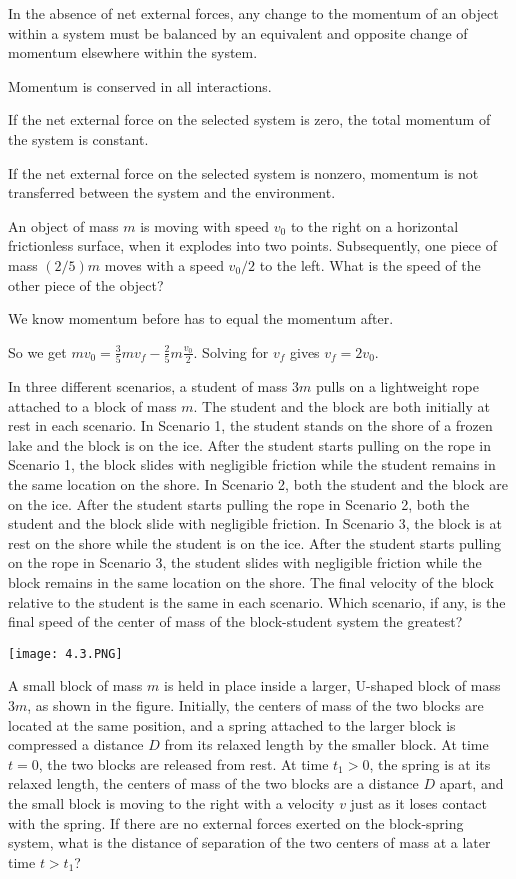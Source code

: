 \documentclass[../mech.tex]{subfiles}
\begin{document}
In the absence of net external forces, any change to the momentum of an object within a system must be balanced by an equivalent and opposite change of momentum elsewhere within the system.

Momentum is conserved in all interactions.

If the net external force on the selected system is zero, the total momentum of the system is constant.

If the net external force on the selected system is nonzero, momentum is not transferred between the system and the environment.

\begin{example}
    An object of mass $m$ is moving with speed $v_0$ to the right on a horizontal frictionless surface, when it explodes into two points. Subsequently, one piece of mass $(2/5)m$ moves with a speed $v_0/2$ to the left. What is the speed of the other piece of the object?

    We know momentum before has to equal the momentum after.

    So we get $mv_0=\frac{3}{5}mv_f-\frac{2}{5}m\frac{v_0}{2}$. Solving for $v_f$ gives $v_f=2v_0$.
\end{example}

\ex In three different scenarios, a student of mass $3m$ pulls on a lightweight rope attached to a block of mass $m$. The student and the block are both initially at rest in each scenario.
In Scenario 1, the student stands on the shore of a frozen lake and the block is on the ice. After the student starts pulling on the rope in Scenario 1, the block slides with negligible friction while the student remains in the same location on the shore.
In Scenario 2, both the student and the block are on the ice. After the student starts pulling the rope in Scenario 2, both the student and the block slide with negligible friction. In Scenario 3, the block is at rest on the shore while the student is on the ice.
After the student starts pulling on the rope in Scenario 3, the student slides with negligible friction while the block remains in the same location on the shore. The final velocity of the block relative to the student is the same in each scenario.
Which scenario, if any, is the final speed of the center of mass of the block-student system the greatest?

\ex \begin{center}
    \texttt{[image: 4.3.PNG]}
\end{center}
A small block of mass $m$ is held in place inside a larger, U-shaped block of mass $3m$, as shown in the figure. Initially, the centers of mass of the two blocks are located at the same position, and a spring 
attached to the larger block is compressed a distance $D$ from its relaxed length by the smaller block. At time $t=0$, the two blocks are released from rest. At time $t_1>0$, the spring is at its relaxed length, the centers of mass of the two blocks are a distance $D$ apart, and the small block is moving 
to the right with a velocity $v$ just as it loses contact with the spring. If there are no external forces exerted on the block-spring system, what is the distance of separation of the two centers of mass at a later time $t>t_1$?
\end{document}
